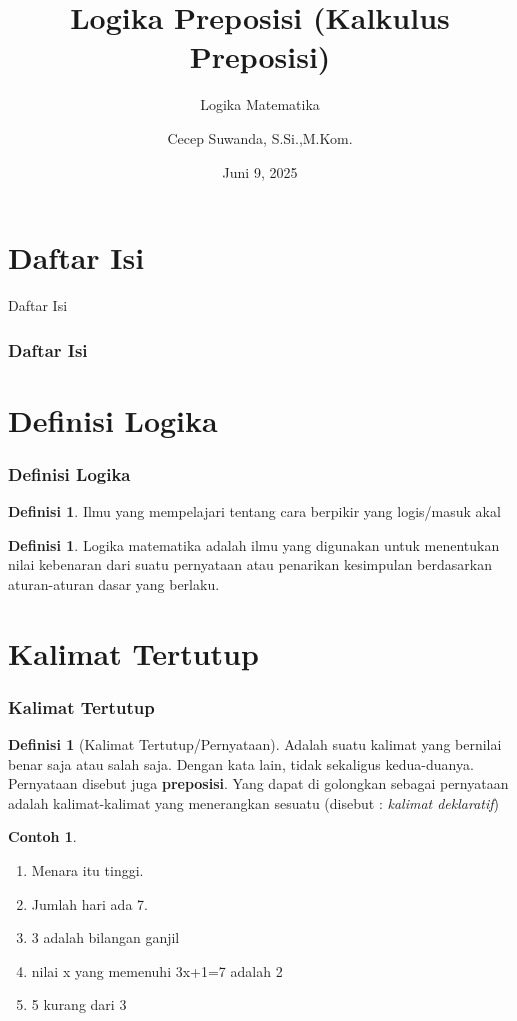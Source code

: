 \documentclass[handout]{beamer}
\subtitle[Logika Matematika]{Logika Matematika}
\title[Logika Preposisi (Kalkulus Preposisi) ]{Logika Preposisi (Kalkulus Preposisi)}
\author{Cecep Suwanda, S.Si.,M.Kom.}
\date{Juni 9, 2025}
\institute{Universitas Bale Bandung}
\theoremstyle{definition}
\newtheorem{definisi}[theorem]{Definisi}
\theoremstyle{example}
\newtheorem{contoh}[theorem]{Contoh}
\begin{document}
\maketitle


\section*{Daftar Isi}
\begin{frame}[shrink]{Daftar Isi}
\frametitle{Daftar Isi}
\tableofcontents
\end{frame}


\section{Definisi Logika}
\begin{frame}
\frametitle{Definisi Logika}
    \begin{definisi}
   	  Ilmu yang mempelajari tentang cara berpikir yang logis/masuk akal 
    \end{definisi}
	\begin{definisi}
      Logika matematika adalah	ilmu yang digunakan untuk menentukan nilai kebenaran dari suatu pernyataan atau penarikan kesimpulan 
      berdasarkan aturan-aturan dasar yang berlaku.         
    \end{definisi}

\end{frame}

\section{Kalimat Tertutup}
\begin{frame}
\frametitle{Kalimat Tertutup}

 \begin{definisi}[Kalimat Tertutup/Pernyataan]
    Adalah suatu kalimat yang bernilai benar saja atau salah saja. Dengan kata lain, tidak sekaligus kedua-duanya. Pernyataan disebut juga \textbf{preposisi}. Yang dapat di golongkan sebagai pernyataan adalah kalimat-kalimat yang menerangkan sesuatu (disebut : \textit{kalimat deklaratif})
 \end{definisi}
 
\begin{contoh}	
	\begin{enumerate}
		\item Menara itu tinggi. 
		\item Jumlah hari ada 7.
		\item 3 adalah bilangan ganjil
		\item nilai x yang memenuhi 3x+1=7 adalah 2
		\item 5 kurang dari 3
	\end{enumerate}	 
\end{contoh}
\end{frame}
\end{document}
